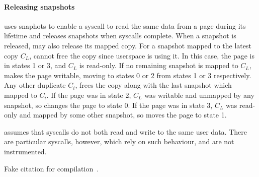 \documentclass[letterpaper,twocolumn,10pt, anonymous]{article}
\begin{document}
\paragraph{Releasing snapshots}
\tiktok uses snaphots to enable a syscall to read the same data from a page 
during its lifetime and releases snapshots when syscalls complete. 
When a snapshot is released, \tiktok may also release its mapped copy.
For a snapshot mapped to the latest copy $C_L$, \tiktok cannot free the copy
since userspace is using it.
In this case, the page is in states 1 or 3, and $C_L$ is read-only.
If no remaining snapshot is mapped to $C_L$, \tiktok makes the 
page writable, moving to states 0 or 2 from states 1 or 3 respectively. 
Any other duplicate $C_i$, \tiktok frees the copy along with the 
last snapshot which mapped to $C_i$.
If the page was in state 2, $C_L$ was writable and unmapped by any snapshot,
so \tiktok changes the page to state 0.
If the page was in state 3, $C_L$ was read-only and mapped by some other
snapshot, so \tiktok moves the page to state 1.

\tiktok assumes that syscalls do not both read and write to the same user data. 
There are particular syscalls, however, which rely on such behaviour, and 
are not instrumented.

Fake citation for compilation~\cite{silberschatz2018operating}.




\end{document}

